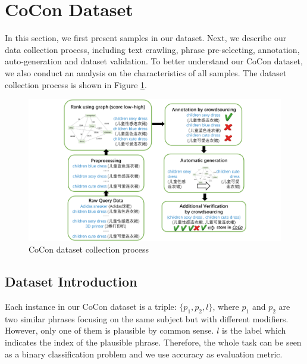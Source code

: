 \section{CoCon Dataset}
In this section, we first present samples in our dataset. Next, we describe our data collection process, including text crawling, phrase pre-selecting, annotation, auto-generation and dataset validation. To better understand our CoCon dataset, we also conduct an analysis on the characteristics of all samples. The dataset collection process is shown in Figure \ref{fig:framework}.

\begin{figure}
	\centering
	\includegraphics[width=\columnwidth]{images/framework.pdf}
	\caption{CoCon dataset collection process}
	\label{fig:framework}
\end{figure}

\subsection{Dataset Introduction}
Each instance in our CoCon dataset is %
a triple: $\{p_1, p_2, l\}$,
where $p_1$ and $p_2$ are two similar phrases focusing on the same subject
but with different modifiers.
However, only one of them is plausible by common sense. 
$l$ is the label which indicates the index of the plausible phrase. 
Therefore, the whole task can be seen as a binary classification problem 
and we use accuracy as evaluation metric. 

